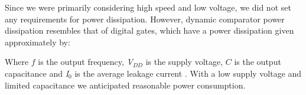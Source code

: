 Since we were primarily considering high speed and low voltage, we did
not set any requirements for power dissipation. However, dynamic
comparator power dissipation resembles that of digital gates, which
have a power dissipation given approximately by:


Where \begin{math}f\end{math} is the output frequency,
\textit{V$_{DD}$} is the supply voltage, \begin{math}C\end{math} is the
output capacitance and \textit{I$_{0}$} is the average leakage current
\cite{vittoz94}
. With a low supply voltage and limited capacitance we anticipated
reasonable power consumption.


